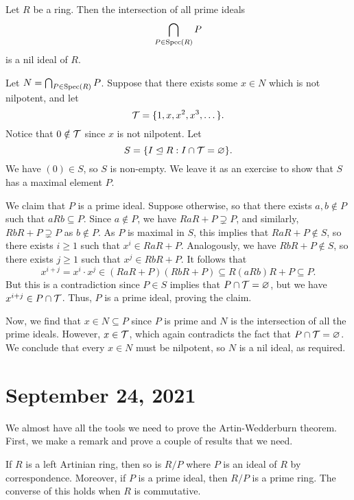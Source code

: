 \begin{thm}
Let $R$ be a ring. Then the intersection of all prime ideals 
\[ \bigcap_{P \in \operatorname{Spec}(R)} P \]
is a nil ideal of $R$. 
\end{thm}
\begin{pf}
Let $N = \bigcap_{P \in \operatorname{Spec}(R)} P$. Suppose that there exists some $x \in N$ which is not nilpotent,
and let 
\[ {\cal T} = \{1, x, x^2, x^3, \dots \}. \]
Notice that $0 \notin {\cal T}$ since $x$ is not nilpotent. Let 
\[ S = \{I \trianglelefteq R : I \cap {\cal T} = \varnothing\}. \]
We have $(0) \in S$, so $S$ is non-empty. We leave it as an exercise to show that $S$ has a maximal 
element $P$. 

We claim that $P$ is a prime ideal. Suppose otherwise, so that there exists $a, b \notin P$ 
such that $aRb \subseteq P$. Since $a \notin P$, we have $RaR + P \supsetneq P$, and similarly, 
$RbR + P \supsetneq P$ as $b \notin P$. As $P$ is maximal in $S$, this implies that 
$RaR + P \notin S$, so there exists $i \geq 1$ such that $x^i \in RaR + P$. 
Analogously, we have $RbR + P \notin S$, so there exists $j \geq 1$ such that $x^j \in RbR + P$. 
It follows that 
\[ x^{i+j} = x^i \cdot x^j \in (RaR + P)(RbR + P) \subseteq R(aRb)R + P \subseteq P. \]
But this is a contradiction since $P \in S$ implies that 
$P \cap {\cal T} = \varnothing$, but we have $x^{i+j} \in P \cap {\cal T}$. 
Thus, $P$ is a prime ideal, proving the claim. 

Now, we find that $x \in N \subseteq P$ since $P$ is prime and $N$ is the intersection of all 
the prime ideals. However, $x \in {\cal T}$, which again contradicts the fact that 
$P \cap {\cal T} = \varnothing$. We conclude that every $x \in N$ must be nilpotent, so 
$N$ is a nil ideal, as required.
\end{pf}

\section{September 24, 2021}
We almost have all the tools we need to prove the Artin-Wedderburn theorem. 
First, we make a remark and prove a couple of results that we need. 

\begin{remark}
If $R$ is a left Artinian ring, then so is $R/P$ where $P$ is an ideal of $R$ by correspondence. 
Moreover, if $P$ is a prime ideal, then $R/P$ is a prime ring. The converse of this holds when 
$R$ is commutative. 
\end{remark}


